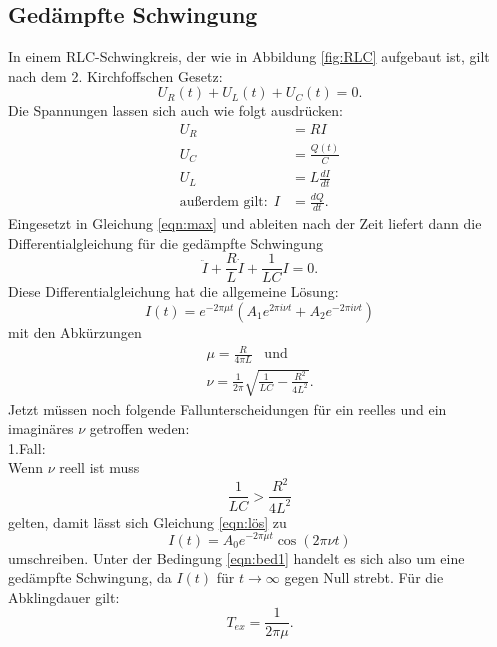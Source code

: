 \subsection{Gedämpfte Schwingung}
In einem RLC-Schwingkreis, der wie in Abbildung \ref{fig:RLC} aufgebaut ist, gilt nach dem
2. Kirchfoffschen Gesetz:
\begin{equation}
  U_{R}(t)+U_{L}(t)+U_{C}(t)=0.
  \label{eqn:max}
\end{equation}
Die Spannungen lassen sich auch wie folgt ausdrücken:
\begin{align}
  U_{R}&=RI\\
  U_{C}&=\frac{Q(t)}{C}\\
  U_{L}&=L\frac{dI}{dt}\\
\text{außerdem gilt:}\:\:I&=\frac{dQ}{dt}.
\end{align}
Eingesetzt in Gleichung \ref{eqn:max} und ableiten nach der Zeit liefert dann die Differentialgleichung
für die gedämpfte Schwingung
\begin{equation}
  \ddot{I}+\frac{R}{L}\dot{I}+\frac{1}{LC}I=0.
  \label{eqn:dgl}
\end{equation}
Diese Differentialgleichung hat die allgemeine Lösung:
\begin{equation}
  I(t)=e^{-2 \pi\mu t}(A_{1}e^{2 \pi i \nu t}+A_{2}e^{-2\pi i \nu t})
  \label{eqn:lös}
\end{equation}
mit den Abkürzungen
\begin{align*}
  \mu = \frac{R}{4\pi L} \;\;\; \text{und}\\
  \nu=\frac{1}{2\pi}\sqrt{\frac{1}{LC}-\frac{R^2}{4L^2}}.
\end{align*}
Jetzt müssen noch folgende Fallunterscheidungen für ein reelles und ein
imaginäres $\nu$ getroffen weden:\\
1.Fall:\\
Wenn $\nu$ reell ist muss
\begin{equation}
  \frac{1}{LC}>\frac{R^2}{4L^2}
  \label{eqn:bed1}
\end{equation}
gelten, damit lässt sich Gleichung \ref{eqn:lös} zu
\begin{equation}
  I(t)=A_{0}e^{-2\pi \mu t}\cos(2\pi \nu t )
\end{equation}
umschreiben. Unter der Bedingung \ref{eqn:bed1} handelt es sich also um
eine gedämpfte Schwingung, da $I(t)$ für $t \to \infty$ gegen Null strebt.
Für die Abklingdauer gilt:
\begin{equation}
  T_{ex}=\frac{1}{2\pi \mu}.
  \label{eqn:tex}
\end{equation}\\
